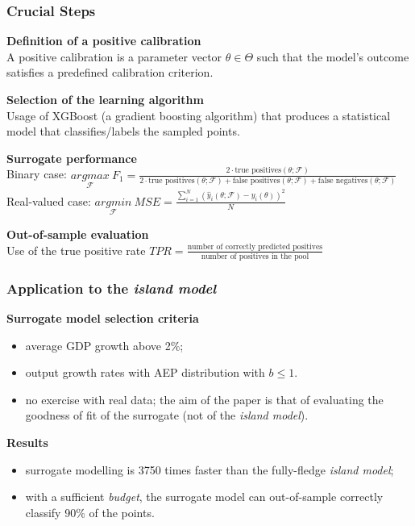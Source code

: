 \documentclass[10pt]{beamer}
\begin{document}
\begin{frame}[c]\frametitle{Crucial Steps}
	\alert{\textbf{Definition of a positive calibration}}
	\\ A positive calibration is a parameter vector $\theta \in \Theta$ such that the model's outcome satisfies a predefined calibration criterion. \bigskip

	\alert{\textbf{Selection of the learning algorithm}}
	\\ Usage of XGBoost (a gradient boosting algorithm) that produces a statistical model that classifies/labels the sampled points. \bigskip

	\alert{\textbf{Surrogate performance}}
	\\ Binary case: $\underset{\mathcal{F}}{argmax} ~ F_{1} =\frac{2 \cdot \text{true positives}(\theta; \mathcal{F})}{2 \cdot \text{true positives}(\theta; \mathcal{F}) + \text{false positives}(\theta; \mathcal{F}) + \text{false negatives}(\theta; \mathcal{F})}$ 
	\\ Real-valued case: $\underset{\mathcal{F}}{argmin} ~ MSE = \frac{\sum_{i=1}^{N}(\hat{y}_{i}(\theta; \mathcal{F}) - y_{i}(\theta))^2}{N}$ \bigskip

	\alert{\textbf{Out-of-sample evaluation}}
	\\ Use of the true positive rate $TPR = \frac{\text{number of correctly predicted positives}}{\text{number of positives in the pool}}$
\end{frame}


\begin{frame}[c]\frametitle{Application to the \citet{dosi2003island} \emph{island model}}
	\alert{\textbf{Surrogate model selection criteria}}
	\begin{itemize}
		\item average GDP growth above 2\%;
		\item output growth rates with AEP distribution with $b \leq 1$.
		\item no exercise with real data; the aim of the paper is that of evaluating the goodness of fit of the surrogate (not of the \citet{dosi2003island} \emph{island model}).
	\end{itemize}

	\alert{\textbf{Results}}
	\begin{itemize}
		\item surrogate modelling is 3750 times faster than the fully-fledge \emph{island model};
		\item with a sufficient \emph{budget}, the surrogate model can out-of-sample correctly classify 90\% of the points.
	\end{itemize}
\end{frame}
\end{document}
